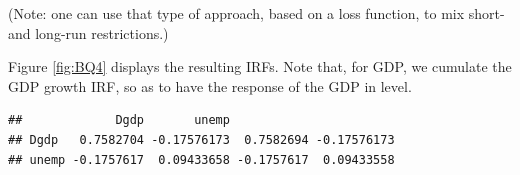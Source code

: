 \documentclass[
  12pt,
]{book}
\newenvironment{Shaded}{\begin{snugshade}}{\end{snugshade}}
\newcommand{\DecValTok}[1]{\textcolor[rgb]{0.00,0.00,0.81}{#1}}
\newcommand{\FunctionTok}[1]{\textcolor[rgb]{0.13,0.29,0.53}{\textbf{#1}}}
\newcommand{\NormalTok}[1]{#1}
\newcommand{\OtherTok}[1]{\textcolor[rgb]{0.56,0.35,0.01}{#1}}
\newcommand{\SpecialCharTok}[1]{\textcolor[rgb]{0.81,0.36,0.00}{\textbf{#1}}}
\theoremstyle{definition}
\theoremstyle{definition}
\theoremstyle{definition}
\theoremstyle{definition}
\theoremstyle{remark}
\begin{document}
(Note: one can use that type of approach, based on a loss function, to mix short- and long-run restrictions.)

Figure \ref{fig:BQ4} displays the resulting IRFs. Note that, for GDP, we cumulate the GDP growth IRF, so as to have the response of the GDP in level.

\begin{Shaded}
\end{Shaded}

\begin{verbatim}
##             Dgdp       unemp                       
## Dgdp   0.7582704 -0.17576173  0.7582694 -0.17576173
## unemp -0.1757617  0.09433658 -0.1757617  0.09433558
\end{verbatim}
\end{document}
